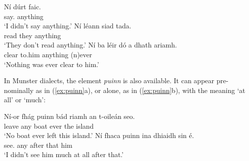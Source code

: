 \documentclass[output=paper,colorlinks,citecolor=brown]{langscibook}
\begin{document}

\ea
\ea
\gll Ní dúrt faic.\\  
     {\no} {say\past.\my} anything\\ 
\glt `I didn't say anything.'
\ex
\gll Ní léann siad tada. \\
     {\no} {read\pres} they anything\\
\glt `They don't read anything.' 
\ex
\gll Ní ba léir dó {a dhath} ariamh. \\
     {\no} {\ba} clear to.him anything (n)ever \\\label{ex:ariamh5}
\glt `Nothing was ever clear to him.'
\z
\z


In Munster dialects, the element {\itshape puinn} is also available. It can appear pre-nominally as in (\ref{ex:puinn}a), or alone, as in (\ref{ex:puinn}b), with the meaning `at all' or `much':

\ea\label{ex:puinn}
\ea
\gll Ní-or fhág puinn bád riamh an t-oileán seo. \\
     {\nior} {leave\past} {any} boat ever the island {\seo} \\
     \label{ex:ariamh6}
\glt `No boat ever left this island.'
\ex
\gll Ní fhaca puinn {ina dhiaidh} sin é.\\
     {\no} {see\past.\my} any after that him \\
\glt `I didn't see him much at all after that.'
\z
\z
\end{document}
